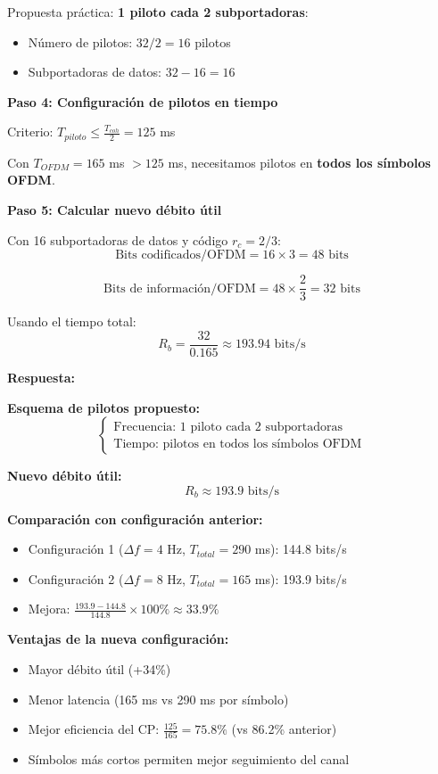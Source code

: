 \documentclass[11pt,a4paper]{article}
\begin{document}
Propuesta práctica: \textbf{1 piloto cada 2 subportadoras}:
\begin{itemize}
    \item Número de pilotos: $32/2 = 16$ pilotos
    \item Subportadoras de datos: $32 - 16 = 16$
\end{itemize}

\textbf{Paso 4: Configuración de pilotos en tiempo}

Criterio: $T_{piloto} \leq \frac{T_{coh}}{2} = 125$ ms

Con $T_{OFDM} = 165$ ms $> 125$ ms, necesitamos pilotos en \textbf{todos los símbolos OFDM}.

\textbf{Paso 5: Calcular nuevo débito útil}

Con 16 subportadoras de datos y código $r_c = 2/3$:
\[
\text{Bits codificados/OFDM} = 16 \times 3 = 48 \text{ bits}
\]

\[
\text{Bits de información/OFDM} = 48 \times \frac{2}{3} = 32 \text{ bits}
\]

Usando el tiempo total:
\[
R_b = \frac{32}{0.165} \approx 193.94 \text{ bits/s}
\]

\textbf{Respuesta:}

\textbf{Esquema de pilotos propuesto:}
\[
\boxed{\begin{cases}
\text{Frecuencia: 1 piloto cada 2 subportadoras} \\
\text{Tiempo: pilotos en todos los símbolos OFDM}
\end{cases}}
\]

\textbf{Nuevo débito útil:}
\[
\boxed{R_b \approx 193.9 \text{ bits/s}}
\]

\textbf{Comparación con configuración anterior:}
\begin{itemize}
    \item Configuración 1 ($\Delta f = 4$ Hz, $T_{total}=290$ ms): 144.8 bits/s
    \item Configuración 2 ($\Delta f = 8$ Hz, $T_{total}=165$ ms): 193.9 bits/s
    \item Mejora: $\frac{193.9-144.8}{144.8} \times 100\% \approx 33.9\%$
\end{itemize}

\textbf{Ventajas de la nueva configuración:}
\begin{itemize}
    \item Mayor débito útil (+34\%)
    \item Menor latencia (165 ms vs 290 ms por símbolo)
    \item Mejor eficiencia del CP: $\frac{125}{165} = 75.8\%$ (vs 86.2\% anterior)
    \item Símbolos más cortos permiten mejor seguimiento del canal
\end{itemize}
\end{document}
